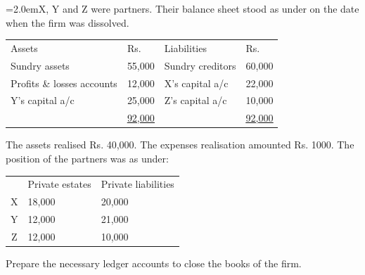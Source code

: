 \documentclass[11pt,a4paper]{article}
\newcommand{\lqn}[2]{\Needspace{6\baselineskip}\par\medskip\noindent\hangindent=2.0em\hangafter=1\makebox[2.0em][l]{\textbf{#1.}}#2\par}
\begin{document}
\lqn{120}{X, Y and Z were partners. Their balance sheet stood as under on the date when the firm was dissolved.\par
\par\smallskip\noindent\hspace*{1.2em}\begin{tabular}{llll}
Assets & Rs. & Liabilities & Rs. \\
Sundry assets & 55,000 & Sundry creditors & 60,000 \\
Profits \& losses accounts & 12,000 & X’s capital a/c & 22,000 \\
Y’s capital a/c & 25,000 & Z’s capital a/c & 10,000 \\
 & \underline{\underline{92,000}} &  & \underline{\underline{92,000}} \\
\end{tabular}\par\smallskip
The assets realised Rs. 40,000. The expenses realisation amounted Rs. 1000. The position of the partners was as under:\par
\par\smallskip\noindent\hspace*{1.2em}\begin{tabular}{|cll|}
\hline
 & Private estates & Private liabilities \\
X & 18,000 & 20,000 \\
Y & 12,000 & 21,000 \\
Z & 12,000 & 10,000 \\
\hline
\end{tabular}\par\smallskip
Prepare the necessary ledger accounts to close the books of the firm.\par
}
\end{document}
